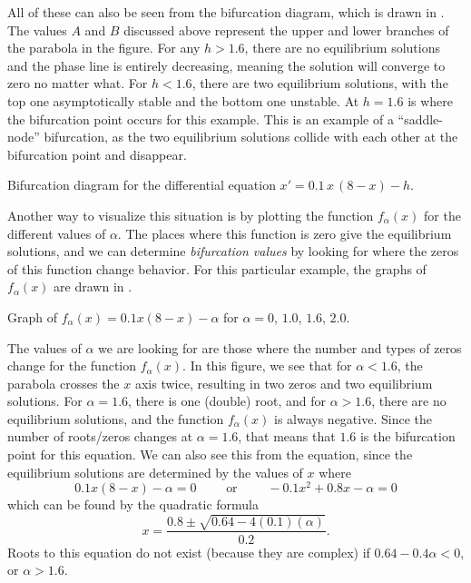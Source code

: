 \documentclass{ximera}
\begin{document}
\begin{exampleSol}
    All of these can also be seen from the bifurcation diagram, which is drawn in . The values $A$ and $B$ discussed above represent the upper and lower branches of the parabola in the figure. For any $h > 1.6$, there are no equilibrium solutions and the phase line is entirely decreasing, meaning the solution will converge to zero no matter what. For $h < 1.6$, there are two equilibrium solutions, with the top one asymptotically stable and the bottom one unstable. At $h=1.6$ is where the bifurcation point occurs for this example. This is an example of a ``saddle-node'' bifurcation, as the two equilibrium solutions collide with each other at the bifurcation point and disappear.  
    
    \begin{myfig}
        \capstart
        \caption{Bifurcation diagram for the differential equation
        $x' = 0.1\,x\,(8-x)-h$.\label{BifDiag_ex2:fig}}
    \end{myfig}
    
    Another way to visualize this situation is by plotting the function $f_\alpha(x)$ for the different values of $\alpha$. The places where this function is zero give the equilibrium solutions, and we can determine \emph{bifurcation values} by looking for where the zeros of this function change behavior. For this particular example, the graphs of $f_\alpha(x)$ are drawn in . 
    
    \begin{myfig}
        \capstart
        \caption{Graph of $f_\alpha(x) = 0.1x(8-x) - \alpha$ for $\alpha = 0$, $1.0$, $1.6$, $2.0$.\label{BifDiag_ex2FGraph:fig}}
    \end{myfig}
\end{exampleSol}

The values of $\alpha$ we are looking for are those where the number and types of zeros change for the function $f_\alpha(x)$. In this figure, we see that for $\alpha < 1.6$, the parabola crosses the $x$ axis twice, resulting in two zeros and two equilibrium solutions. For $\alpha = 1.6$, there is one (double) root, and for $\alpha > 1.6$, there are no equilibrium solutions, and the function $f_\alpha(x)$ is always negative. Since the number of roots/zeros changes at $\alpha = 1.6$, that means that $1.6$ is the bifurcation point for this equation. We can also see this from the equation, since the equilibrium solutions are determined by the values of $x$ where
\begin{equation*}
    0.1x(8-x) - \alpha = 0 \qquad \text{ or } \qquad -0.1x^2 + 0.8x - \alpha = 0 
\end{equation*}
which can be found by the quadratic formula
\begin{equation*}
    x = \frac{0.8 \pm \sqrt{0.64 - 4(0.1)(\alpha)}}{0.2}.
\end{equation*}
Roots to this equation do not exist (because they are complex) if $0.64 - 0.4\alpha < 0$, or $\alpha > 1.6$. 
\end{document}
